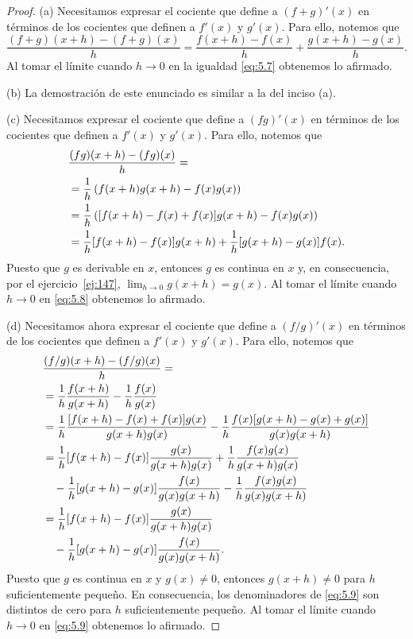 \documentclass[12pt,a4paper]{book}
\begin{document}
    \begin{proof}
        (a) Necesitamos expresar el cociente que define a $(f+g)'(x)$
        en términos de los cocientes que definen a $f'(x)$ y $g'(x)$. Para ello, notemos
        que
        \begin{equation}\label{eq:5.7}
            \frac{(f+g)(x+h)-(f+g)(x)}{h}=\frac{f(x+h)-f(x)}{h}+\frac{g(x+h)-g(x)}{h}.
        \end{equation}
        Al tomar el límite cuando $h\to 0$ en la igualdad \eqref{eq:5.7} obtenemos lo afirmado.

        (b) La demostración de este enunciado es similar a la del inciso (a).

        (c) Necesitamos expresar el cociente que define a $(fg)'(x)$ en términos de
        los cocientes que definen a $f'(x)$ y $g'(x)$. Para ello, notemos que
        \begin{align}
            &\frac{(fg)(x+h)-(fg)(x)}{h}=\notag\\
            &=\frac{1}{h}\left(f(x+h)g(x+h)-f(x)g(x)\right)\notag\\
            &=\frac{1}{h}\left([f(x+h)-f(x)+f(x)]g(x+h)-f(x)g(x)\right)\notag\\
            &=\frac{1}{h}[f(x+h)-f(x)]g(x+h)+\frac{1}{h}[g(x+h)-g(x)]f(x).\label{eq:5.8}
        \end{align}
        Puesto que $g$ es derivable en $x$, entonces $g$ es continua en $x$ y, en consecuencia,
        por el ejercicio~\ref{ej:147}, $\lim_{h\to 0}g(x+h)=g(x)$. Al tomar el límite cuando $h\to 0$
        en \eqref{eq:5.8} obtenemos lo afirmado.

        (d) Necesitamos ahora expresar el cociente que define a $(f/g)'(x)$ en
        términos de los cocientes que definen a $f'(x)$ y $g'(x)$. Para ello, notemos que
        \begin{align}
            &\frac{(f/g)(x+h)-(f/g)(x)}{h}=\notag\\
            &=\frac{1}{h}\frac{f(x+h)}{g(x+h)}-\frac{1}{h}\frac{f(x)}{g(x)}\notag\\
            &=\frac{1}{h}\frac{[f(x+h)-f(x)+f(x)]g(x)}{g(x+h)g(x)}-\frac{1}{h}\frac{f(x)[g(x+h)-g(x)+g(x)]}{g(x)g(x+h)}\notag\\
            &=\frac{1}{h}[f(x+h)-f(x)]\frac{g(x)}{g(x+h)g(x)}+\frac{1}{h}\frac{f(x)g(x)}{g(x+h)g(x)}\notag\\
            &\quad-\frac{1}{h}[g(x+h)-g(x)]\frac{f(x)}{g(x)g(x+h)}-\frac{1}{h}\frac{f(x)g(x)}{g(x)g(x+h)}\notag\\
            &=\frac{1}{h}[f(x+h)-f(x)]\frac{g(x)}{g(x+h)g(x)}\notag\\
            &\quad-\frac{1}{h}[g(x+h)-g(x)]\frac{f(x)}{g(x)g(x+h)}.\label{eq:5.9}
        \end{align}
        Puesto que $g$ es continua en $x$ y $g(x)\neq 0$, entonces $g(x+h)\neq 0$ para $h$
        suficientemente pequeño. En consecuencia, los denominadores de \eqref{eq:5.9} son
        distintos de cero para $h$ suficientemente pequeño. Al tomar el límite cuando
        $h\to 0$ en \eqref{eq:5.9} obtenemos lo afirmado.
    \end{proof}
\end{document}
